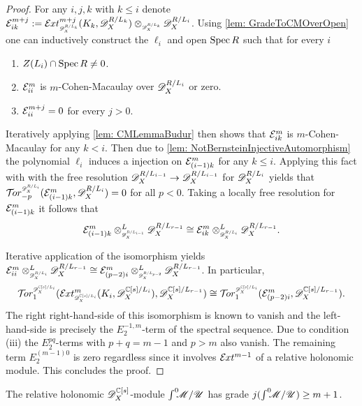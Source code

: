 \begin{proof}
  For any $i,j,k$ with $k\leq i$ denote $\E_{ik}^{m+j}:= \Ex{\D_\X^{R/L_{k}} }{m+j}(K_k, \D_\X^{R/L_k}) \otimes_{\scaleto{\D_\X^{R/L_{k}}}{8pt}} \D_\X^{R/L_{i}}$.
  Using \cref{lem: GradeToCMOverOpen} one can inductively construct the $\ell_i$ and open $\operatorname{Spec} R$ such that for every $i$
  \begin{enumerate}[label=(\roman*)]
    \item $Z(L_i)\cap \operatorname{Spec} R \neq 0$.
    \item $\mathcal{E}_{ii}^{m}$ is $m$-Cohen-Macaulay over $\mathscr{D}_X^{R/L_i}$ or zero.
    \item $\mathcal{E}_{ii}^{m+j} = 0$ for every $j>0$.
  \end{enumerate}
  Iteratively applying \cref{lem: CMLemmaBudur} then shows that $\mathcal{E}_{ik}^{m}$ is $m$-Cohen-Macaulay for any $k<i$.
  Then due to \cref{lem: NotBernsteinInjectiveAutomorphism} the polynomial $\ell_i$ induces a injection on $\mathcal{E}_{(i-1)k}^{m}$ for any $k\leq i$.
  Applying this fact with with the free resolution $\mathscr{D}_X^{R/L_{i-1}}\to \mathscr{D}_X^{R/L_{i-1}}$ for $\mathscr{D}_X^{R/L_i}$ yields that $\Tr{\D_\X^{R/L_i}}{-p}(\E_{(i-1)k}^{m}, \D_\X^{R/L_i}) = 0$ for all $p<0$.
  Taking a locally free resolution for $\mathcal{E}_{(i-1)k}^m$ it follows that
  $$\mathcal{E}_{(i-1)k}^{m} \otimes^L_{\scaleto{\D_\X^{R/L_{i-1}}}{8pt}} \D_\X^{R/L_{r-1}} \cong  \mathcal{E}_{ik}^{m}  \otimes^L_{\scaleto{\D_\X^{R/L_{i}}}{8pt}}\D_\X^{R/L_{r-1}}. $$


  Iterative application of the isomorphism yields $\E_{ii}^{m}\otimes^L_{\scaleto{\D_\X^{R/L_{i}}}{8pt}} \D_\X^{R/L_{r-1}} \cong \E_{(p-2)i}^{m}\otimes^L_{\scaleto{\D_\X^{R/L_{p-2}}}{8pt}} \D_\X^{R/L_{r-1}}$.
  In particular,
  $$\Tr{\D_\X^{\C[s]/L_{i}}}{1} (\Ex{\D_\X^{\C[s]/L_{i}} }{m} (K_i,\D_\X^{\C[s]/L_{i}}), \D_\X^{\C[s]/L_{r-1}})\cong \Tr{\D_\X^{\C[s]/L_{i}} }{1}(\E_{(p-2)i}^{m}, \D_\X^{\C[s]/L_{r-1}}).$$
  The right right-hand-side of this isomorphism is known to vanish  and the left-hand-side is precisely the $E^{-1,m}_2$-term of the spectral sequence.
  Due to condition (iii) the $E^{pq}_2$-terms with $p+q = m -1$ and $p>m$ also vanish.
  The remaining term $E^{(m -1)0}_2$ is zero regardless since it involves $\mathcal{E}\mkern -1mu xt^{m - 1}$ of a relative holonomic module.
  This concludes the proof.
\end{proof}
\begin{lemma}\label{lem: GradeNPlusOne}
  The relative holonomic $\mathscr{D}_X^{\mathbb{C}[s]}$-module $\int^0 \mkern -8mu\mathscr{M}/\mathscr{U}$ has grade $j(\int^0 \mkern -8mu\mathscr{M}/\mathscr{U})\geq m+1$.
\end{lemma}
